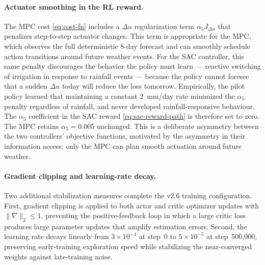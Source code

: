 \paragraph{Actuator smoothing in the RL reward.}
The MPC cost \eqref{eq:cost-fn} includes a $\Delta u$ regularization term
$\alpha_5 J_{\Delta u}$ that penalizes step-to-step actuator changes. This
term is appropriate for the MPC, which observes the full deterministic
8-day forecast and can smoothly schedule action transitions around future
weather events. For the SAC controller, this same penalty discourages the
behavior the policy must learn — reactive switching of irrigation in
response to rainfall events — because the policy cannot foresee that a
sudden $\Delta u$ today will reduce the loss tomorrow. Empirically, the
pilot policy learned that maintaining a constant 2~mm/day rate minimized
the $\alpha_5$ penalty regardless of rainfall, and never developed
rainfall-responsive behaviour. The $\alpha_5$ coefficient in the SAC reward
\eqref{eq:sac-reward-path} is therefore set to zero. The MPC retains
$\alpha_5 = 0.005$ unchanged. This is a deliberate asymmetry between the
two controllers' objective functions, motivated by the asymmetry in their
information access: only the MPC can plan smooth actuation around future
weather.

\paragraph{Gradient clipping and learning-rate decay.}
Two additional stabilization measures complete the v2.6 training
configuration. First, gradient clipping is applied to both actor and critic
optimizer updates with $\|\nabla\|_2 \le 1$, preventing the positive-feedback
loop in which a large critic loss produces large parameter updates that
amplify estimation errors. Second, the learning rate decays linearly from
$3\!\times\!10^{-4}$ at step~0 to $5\!\times\!10^{-5}$ at step~500{,}000,
preserving early-training exploration speed while stabilizing the
near-converged weights against late-training noise.

